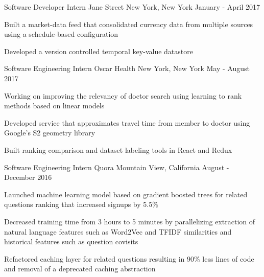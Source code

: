 \begin{cventries}
  \cventry
    {Software Developer Intern}
    {Jane Street}
    {New York, New York}
    {January - April 2017}
    {
      \begin{cvitems}
      \item Built a market-data feed that consolidated currency data from multiple sources using a schedule-based configuration
      \item Developed a version controlled temporal key-value datastore
      \end{cvitems}
    }
  \cventry
    {Software Engineering Intern}
    {Oscar Health}
    {New York, New York}
    {May - August 2017}
    {
      \begin{cvitems}
      \item Working on improving the relevancy of doctor search using learning to rank methods based on linear models
      \item Developed service that approximates travel time from member to doctor using Google's S2 geometry library
      \item Built ranking comparison and dataset labeling tools in React and Redux%
      \end{cvitems}
    }
  \cventry
    {Software Engineering Intern}
    {Quora}
    {Mountain View, California}
    {August - December 2016}
    {
      \begin{cvitems}
      \item Launched machine learning model based on gradient boosted trees for related questions ranking that increased signups by 5.5\%
      \item Decreased training time from 3 hours to 5 minutes by parallelizing extraction of natural language features such as Word2Vec and TFIDF similarities and historical features such as question covisits
      \item Refactored caching layer for related questions resulting in 90\% less lines of code and removal of a deprecated caching abstraction

\end{cvitems}}
\end{cventries}
